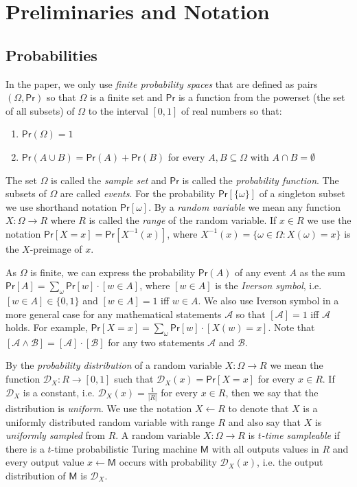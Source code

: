 \documentclass{article}
\newcommand{\prob}[0]{\mathsf{Pr}} %
\begin{document}
\section{Preliminaries and Notation}

\subsection{Probabilities}

In the paper, we only use \emph{finite probability spaces} that are defined as pairs $(\Omega, \prob)$ so that $\Omega$ is a finite set and $\prob$ is a function from the powerset (the set of all subsets) of $\Omega$ to the interval $[0,1]$ of real numbers so that:
\begin{enumerate}
\item $\prob(\Omega)=1$
\item $\prob(A\cup B)=\prob(A) + \prob(B)$ for every $A,B\subseteq \Omega$ with $A\cap B=\emptyset$
\end{enumerate}

\noindent The set $\Omega$ is called the \emph{sample set} and $\prob$ is called the \emph{probability function}. The subsets of $\Omega$ are called \emph{events}. For the probability $\prob[\{\omega\}]$ of a singleton subset we use shorthand notation $\prob[\omega]$.
By a \emph{random variable} we mean any function $X\colon \Omega \rightarrow R$ where $R$ is called the \emph{range} of the random variable. If $x\in R$ we use the notation $\prob[X=x] = \prob[X^{-1}(x)]$, where $X^{-1}(x)=\{\omega\in\Omega\colon X(\omega)=x\}$ is the $X$-preimage of $x$.

As $\Omega$ is finite, we can express the probability $\prob(A)$ of any event $A$ as the sum $\prob[A]=\sum_\omega \prob[w]\cdot [w\in A]$, where
$[w\in A]$ is the \emph{Iverson symbol}, i.e. $[w\in A]\in\{0,1\}$ and $[w\in A]=1$ iff $w\in A$. We also use Iverson symbol in a more general case for any mathematical statements $\mathcal{A}$ so that $[\mathcal{A}]=1$ iff $\mathcal{A}$ holds. For example, $\prob[X=x]=\sum_\omega \prob[w]\cdot [X(w)=x]$. Note that $[\mathcal{A}\wedge \mathcal{B}]=[\mathcal{A}]\cdot[\mathcal{B}]$ for any two statements
$\mathcal{A}$ and $\mathcal{B}$.

By the \emph{probability distribution} of a random variable $X\colon \Omega \rightarrow R$ we mean the function $\mathcal{D}_X\colon R\rightarrow [0,1]$ such that $\mathcal{D}_X(x)=\prob[X=x]$ for every $x\in R$.
If $\mathcal{D}_X$ is a constant, i.e.
$\mathcal{D}_X(x)=\frac{1}{|R|}$ for every $x\in R$, then we say that the distribution is \emph{uniform}.
We use the notation $X\gets R$ to denote that $X$ is a uniformly distributed random variable with range $R$ and also say that $X$ is \emph{uniformly sampled} from $R$.
A random variable $X\colon \Omega \rightarrow R$ is \emph{$t$-time sampleable} if there is a $t$-time probabilistic Turing machine $\mathsf{M}$
with all outputs values in $R$ and every output value $x\gets \mathsf{M}$ occurs with probability $\mathcal{D}_X(x)$, i.e. the output distribution of
$\mathsf{M}$ is $\mathcal{D}_X$.
\end{document}
